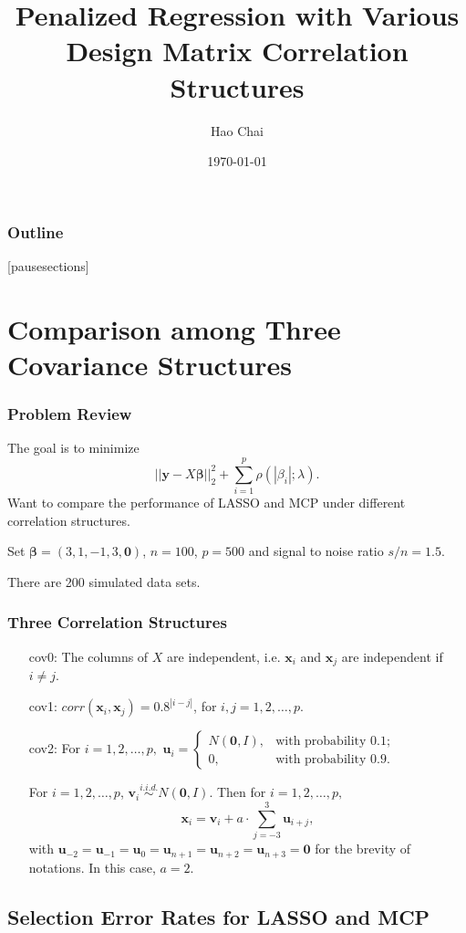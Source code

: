\documentclass{beamer}
\title %
{Penalized Regression with Various Design Matrix Correlation Structures}
\author{Hao Chai\inst{}}
\institute[U of Iowa] %
{
  \inst{}
   Department of Statistics and Actuarial Science \\
  The University of Iowa
}
\date[] %
{\today}
\newcommand{\bm}[1]{{\boldsymbol {#1}}}
\begin{document}
\begin{frame}
  \titlepage
\end{frame}

\begin{frame}
  \frametitle{Outline}
  \tableofcontents
  [pausesections]
\end{frame}


\section{Comparison among Three Covariance Structures}
\begin{frame}
\frametitle{Problem Review}
The goal is to minimize $$||\mathbf{y}-X\bm\beta||^2_2+\sum_{i=1}^p\rho(|\beta_i|;\lambda).$$
\pause
Want to compare the performance of LASSO and MCP under different correlation structures.

Set $\bm\beta=(3, 1, -1, 3, \mathbf{0})$, $n=100$, $p=500$ and signal to noise ratio $s/n = 1.5$.

There are 200 simulated data sets.
\end{frame}

\begin{frame}
\frametitle{Three Correlation Structures}
\begin{enumerate}
\item[cov0:]The columns of $X$ are independent, i.e. $\mathbf{x}_i$ and $\mathbf{x}_j$ are independent if $i\neq j$.
\item[cov1:]$corr(\mathbf{x}_i,\mathbf{x}_j)=0.8^{|i-j|}$, for $i,j=1, 2, \ldots, p$.
\item[cov2:]For $i=1, 2, \ldots, p,$ $\mathbf{u}_i=\begin{cases}N(\mathbf{0},I),& \mbox{with probability 0.1};\\
0, & \mbox{with probability 0.9}.
\end{cases}$

For $i=1, 2, \ldots, p$, $\mathbf{v}_i\stackrel{i.i.d.}\sim N(\mathbf{0}, I)$.
Then for $i=1, 2, \ldots, p, $
$$\mathbf{x}_i=\mathbf{v}_i+a \cdot \sum_{j=-3}^3\mathbf{u}_{i+j},$$
with $\mathbf{u}_{-2}=\mathbf{u}_{-1}=\mathbf{u}_{0}=\mathbf{u}_{n+1}=\mathbf{u}_{n+2}=\mathbf{u}_{n+3}=\mathbf{0}$ for the brevity of notations. In this case, $a =2$.
\end{enumerate}
\end{frame}
\subsection{Selection Error Rates for LASSO and MCP}
\end{document}

